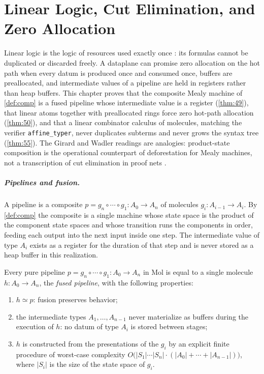 \chapter{Linear Logic, Cut Elimination, and Zero Allocation}\label{ch:linear}

Linear logic is the logic of resources used exactly once \citep{girard}: its formulas cannot be duplicated or discarded freely. A dataplane can promise zero allocation on the hot path when every datum is produced once and consumed once, buffers are preallocated, and intermediate values of a pipeline are held in registers rather than heap buffers. This chapter proves that the composite Mealy machine of \autoref{def:comp} is a fused pipeline whose intermediate value is a register (\autoref{thm:49}), that linear atoms together with preallocated rings force zero hot-path allocation (\autoref{thm:50}), and that a linear combinator calculus of molecules, matching the verifier \texttt{affine\_typer}, never duplicates subterms and never grows the syntax tree (\autoref{thm:55}). The Girard and Wadler readings are analogies: product-state composition is the operational counterpart of deforestation for Mealy machines, not a transcription of cut elimination in proof nets \citep{girard, wadler}.

\paragraph{Pipelines and fusion.}
A pipeline is a composite $p = g_n \circ \cdots \circ g_1 : A_0 \to A_n$ of molecules $g_i : A_{i-1} \to A_i$. By \autoref{def:comp} the composite is a single machine whose state space is the product of the component state spaces and whose transition runs the components in order, feeding each output into the next input inside one step. The intermediate value of type $A_i$ exists as a register for the duration of that step and is never stored as a heap buffer in this realization.

\begin{theorem}\label{thm:49}
Every pure pipeline $p = g_n \circ \cdots \circ g_1 : A_0 \to A_n$ in Mol is equal to a single molecule $h : A_0 \to A_n$, the \emph{fused pipeline}, with the following properties:
\begin{enumerate}
\item $h \simeq p$: fusion preserves behavior;
\item the intermediate types $A_1, \ldots, A_{n-1}$ never materialize as buffers during the execution of $h$: no datum of type $A_i$ is stored between stages;
\item $h$ is constructed from the presentations of the $g_i$ by an explicit finite procedure of worst-case complexity $O\bigl (|S_1| \cdots |S_n| \cdot (|A_0| + \cdots + |A_{n-1}|)\bigr)$, where $|S_i|$ is the size of the state space of $g_i$.
\end{enumerate}
\end{theorem}


